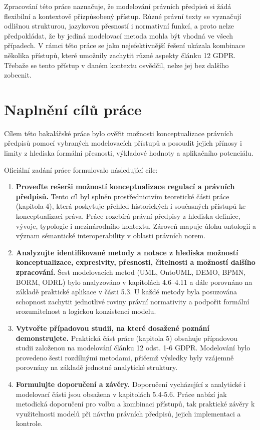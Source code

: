 Zpracování této práce naznačuje, že modelování právních předpisů si žádá flexibilní a kontextově přizpůsobený přístup. Různé právní texty se vyznačují odlišnou strukturou, jazykovou přesností i normativní funkcí, a proto nelze předpokládat, že by jediná modelovací metoda mohla být vhodná ve všech případech. V rámci této práce se jako nejefektivnější řešení ukázala kombinace několika přístupů, které umožnily zachytit různé aspekty článku 12 GDPR. Třebaže se tento přístup v daném kontextu osvědčil, nelze jej bez dalšího zobecnit. 


\section{Naplnění cílů práce}
Cílem této bakalářské práce bylo ověřit možnosti konceptualizace právních předpisů pomocí vybraných modelovacích přístupů a posoudit jejich přínosy i limity z hlediska formální přesnosti, výkladové hodnoty a aplikačního potenciálu. 

Oficiální zadání práce formulovalo následující cíle:

\begin{enumerate}
  \item \textbf{Proveďte rešerši možností konceptualizace regulací a právních předpisů.}  
  Tento cíl byl splněn prostřednictvím teoretické části práce (kapitola 4), která poskytuje přehled historických i současných přístupů ke konceptualizaci práva. Práce rozebírá právní předpisy z hlediska definice, vývoje, typologie i mezinárodního kontextu. Zároveň mapuje úlohu ontologií a význam sémantické interoperability v oblasti právních norem.

  \item \textbf{Analyzujte identifikované metody a notace z hlediska možností konceptualizace, expresivity, přesnosti, čitelnosti a možností dalšího zpracování.}  
  Šest modelovacích metod (UML, OntoUML, DEMO, BPMN, BORM, ODRL) bylo analyzováno v kapitolách 4.6–4.11 a dále porovnáno na základě praktické aplikace v části 5.3. U každé metody byla posuzována schopnost zachytit jednotlivé roviny právní normativity a podpořit formální srozumitelnost a logickou konzistenci modelu.

  \item \textbf{Vytvořte případovou studii, na které dosažené poznání demonstrujete.}  
  Praktická část práce (kapitola 5) obsahuje případovou studii založenou na modelování článku 12 odst. 1-6 GDPR. Modelování bylo provedeno šesti rozdílnými metodami, přičemž výsledky byly vzájemně porovnány na základě jednotné analytické struktury.

  \item \textbf{Formulujte doporučení a závěry.}  
  Doporučení vycházející z analytické i modelovací části jsou obsažena v kapitolách 5.4-5.6. Práce nabízí jak metodická doporučení pro volbu a kombinaci přístupů, tak praktické závěry k využitelnosti modelů při návrhu právních předpisů, jejich implementaci a kontrole.
\end{enumerate}

